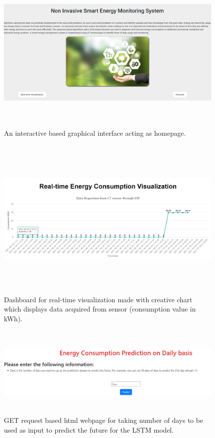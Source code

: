 \documentclass[12 pt]{report}
\begin{document}
  \begin{figure}[h!]
\centering
\includegraphics[width=16cm,height = 8cm,frame]{images/homepage.png}
\caption{An interactive based graphical interface  acting as homepage.}
\label{fig:homepage of energy monitoring system}
\end{figure}

 \begin{figure}[h!]
 \centering
 \includegraphics[width=16cm,height =8cm,frame]{images/dashboard.png}
 \caption{Dashboard for real-time visualization made with creative chart which displays data acquired from sensor (consumption value in kWh).}
 \label{fig:Dashboard depicting Realtime usage}
\end{figure}

\begin{figure}[h!]
 \centering
 \includegraphics[width=17cm,height = 4.5cm,frame]{images/form.png}
 \caption{GET request based html webpage for taking number of days to be used as input to predict the future for the LSTM model.}
 \label{fig: Form for user input}
\end{figure}
\end{document}
